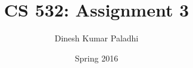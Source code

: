 \documentclass[letterpaper]{report}
\begin{document}
\renewcommand{\thesection}{\arabic{section}}

\author{Dinesh Kumar Paladhi}
\title{CS 532: Assignment 3}

\date{Spring 2016}
\maketitle

\tableofcontents
\newpage










\nocite {*} 
\end{document}

